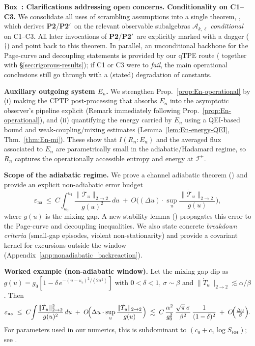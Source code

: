 \documentclass[11pt,a4paper]{article}
\newcommand{\Ptwo}{\textbf{P2}\xspace}
\newcommand{\PtwoPrime}{\textbf{P2$'$}\xspace}
\newcounter{boxedresult}
\newenvironment{boxedresult}[1]{\refstepcounter{boxedresult}\begin{infobox}\noindent\textbf{Box~\theboxedresult: #1.}}{\end{infobox}}
\newcommand{\SBH}{\ensuremath{S_{\mathrm{BH}}}}
\theoremstyle{plain}
\theoremstyle{definition}
\theoremstyle{remark}
\begin{document}
\begin{boxedresult}{Clarifications addressing open concerns}\label{box:concern-resolution}
\noindent\textbf{Conditionality on C1--C3.}
We consolidate all uses of scrambling assumptions into a single theorem, , which derives \Ptwo/\PtwoPrime\ on the relevant observable subalgebras $\mathscr{A}_{k,\ell}$ \emph{conditional} on C1--C3. All later invocations of \Ptwo/\PtwoPrime\ are explicitly marked with a dagger ($\dagger$) and point back to this theorem. In parallel, an unconditional backbone for the Page-curve and decoupling statements is provided by our qTPE route ( together with \S\ref{sec:rigorous-results}); if C1 or C3 were to \emph{fail}, the main operational conclusions still go through with a (stated) degradation of constants.

\medskip
\noindent\textbf{Auxiliary outgoing system $E_n$.}
We strengthen Prop.~\ref{prop:En-operational} by (i) making the CPTP post-processing that absorbs $E_n$ into the asymptotic observer's pipeline explicit (Remark immediately following Prop.~\ref{prop:En-operational}), and (ii) quantifying the energy carried by $E_n$ using a QEI-based bound and weak-coupling/mixing estimates (Lemma~\ref{lem:En-energy-QEI}, Thm.~\ref{thm:En-mi}). These show that $I(R_n{:}E_n)$ and the averaged flux associated to $E_n$ are parametrically small in the adiabatic/Hadamard regime, so $R_n$ captures the operationally accessible entropy and energy at $\mathscr{I}^+$.

\medskip
\noindent\textbf{Scope of the adiabatic regime.}
We prove a channel adiabatic theorem () and provide an explicit non-adiabatic error budget
\[
\varepsilon_{\mathrm{na}}
\ \le\
 C\!\int_{u_0}^{u_1}\!\frac{\|\dot{\mathcal{T}}_u\|_{2\to 2}}{g(u)^2}\,du
\ +\ O\!\Big((\Delta u)\cdot \sup_u \frac{\|\dot{\mathcal{T}}_u\|_{2\to 2}}{g(u)}\Big),
\]
where $g(u)$ is the mixing gap. A new stability lemma () propagates this error to the Page-curve and decoupling inequalities. We also state concrete \emph{breakdown criteria} (small-gap episodes, violent non-stationarity) and provide a covariant kernel for excursions outside the window (Appendix~\ref{app:nonadiabatic_backreaction}).

% 
\medskip\noindent\textbf{Worked example (non-adiabatic window).}
Let the mixing gap dip as $g(u)=g_0[1-\delta\,e^{-(u-u_c)^2/(2\sigma^2)}]$ with $0<\delta<1$, $\sigma\!\sim\!\beta$ and $\|\dot T_u\|_{2\to2}\!\lesssim\!\alpha/\beta$. Then
\[
\varepsilon_{\rm na}\;\le\; C\!\int\! \frac{\|\dot T_u\|_{2\to2}^2}{g(u)^2}\,du\;+\;O\!\Bigl(\Delta u\cdot \sup_u\frac{\|\dot T_u\|_{2\to2}}{g(u)}\Bigr)
\;\lesssim\;
C\,\frac{\alpha^2}{g_0^2}\,\frac{\sqrt{\pi}\,\sigma}{\beta^2}\,\frac{1}{(1-\delta)^2}\;+\;O\!\Bigl(\tfrac{\Delta u}{\beta}\Bigr).
\]
For parameters used in our numerics, this is subdominant to $(c_0\!+\!c_1\log\SBH)$; see .


\end{boxedresult}
\end{document}
